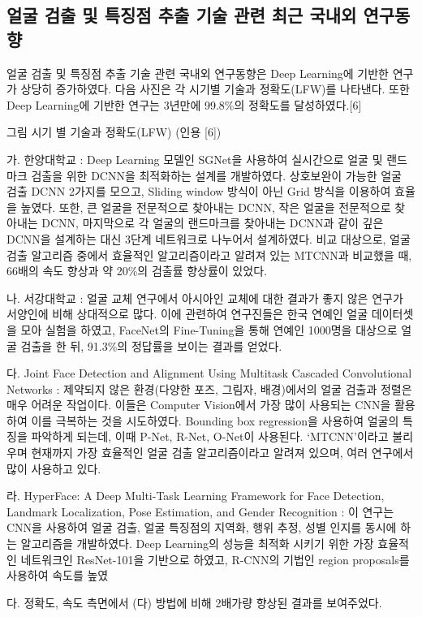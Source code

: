 \documentclass{oblivoir}
\begin{document}
\subsection{얼굴 검출 및 특징점 추출 기술 관련 최근 국내외 연구동향}

얼굴 검출 및 특징점 추출 기술 관련 국내외 연구동향은 Deep Learning에 기반한 연구가 상당히 증가하였다. 다음 사진은 각 시기별 기술과 정확도(LFW)를 나타낸다. 또한 Deep Learning에 기반한 연구는 3년만에 99.8\%의 정확도를 달성하였다.[6]

그림  시기 별 기술과 정확도(LFW) (인용 [6])

가. 한양대학교 : Deep Learning 모델인 SGNet을 사용하여 실시간으로 얼굴 및 랜드마크 검출을 위한 DCNN을 최적화하는 설계를 개발하였다. 상호보완이 가능한 얼굴 검출 DCNN 2가지를 모으고, Sliding window 방식이 아닌 Grid 방식을 이용하여 효율을 높였다. 또한, 큰 얼굴을 전문적으로 찾아내는 DCNN, 작은 얼굴을 전문적으로 찾아내는 DCNN, 마지막으로 각 얼굴의 랜드마크를 찾아내는 DCNN과 같이 깊은 DCNN을 설계하는 대신 3단계 네트워크로 나누어서 설계하였다. 비교 대상으로, 얼굴 검출 알고리즘 중에서 효율적인 알고리즘이라고 알려져 있는 MTCNN과 비교했을 때, 66배의 속도 향상과 약 20\%의 검출률 향상률이 있었다.

나. 서강대학교 : 얼굴 교체 연구에서 아시아인 교체에 대한 결과가 좋지 않은 연구가 서양인에 비해 상대적으로 많다. 이에 관련하여 연구진들은 한국 연예인 얼굴 데이터셋을 모아 실험을 하였고, FaceNet의 Fine-Tuning을 통해 연예인 1000명을 대상으로 얼굴 검출을 한 뒤, 91.3\%의 정답률을 보이는 결과를 얻었다.

다. Joint Face Detection and Alignment Using Multitask Cascaded Convolutional Networks : 제약되지 않은 환경(다양한 포즈, 그림자, 배경)에서의 얼굴 검출과 정렬은 매우 어려운 작업이다. 이들은 Computer Vision에서 가장 많이 사용되는 CNN을 활용하여 이를 극복하는 것을 시도하였다. Bounding box regression을 사용하여 얼굴의 특징을 파악하게 되는데, 이때 P-Net, R-Net, O-Net이 사용된다. ‘MTCNN’이라고 불리우며 현재까지 가장 효율적인 얼굴 검출 알고리즘이라고 알려져 있으며, 여러 연구에서 많이 사용하고 있다. 

라. HyperFace: A Deep Multi-Task Learning Framework for Face Detection, Landmark Localization, Pose Estimation, and Gender Recognition : 이 연구는 CNN을 사용하여 얼굴 검출, 얼굴 특징점의 지역화, 행위 추정, 성별 인지를 동시에 하는 알고리즘을 개발하였다. Deep Learning의 성능을 최적화 시키기 위한 가장 효율적인 네트워크인 ResNet-101을 기반으로 하였고, R-CNN의 기법인 region proposals를 사용하여 속도를 높였

다. 정확도, 속도 측면에서 (다) 방법에 비해 2배가량 향상된 결과를 보여주었다. 
\end{document}
